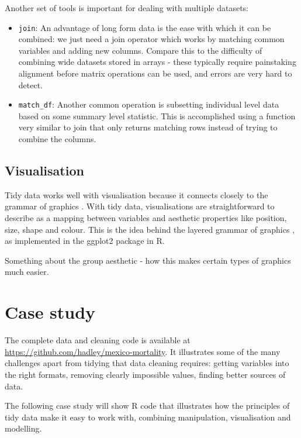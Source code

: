 \documentclass[oneside]{article}
\begin{document}
Another set of tools is important for dealing with multiple datasets: 

\begin{itemize}

\item {\tt join}: An advantage of long form data is the ease with which it can be combined: we just need a join operator which works by matching common variables and adding new columns. Compare this to the difficulty of combining wide datasets stored in arrays - these typically require painstaking alignment before matrix operations can be used, and errors are very hard to detect. 

\item {\tt match\_df}: Another common operation is subsetting individual level data based on some summary level statistic. This is accomplished using a function very similar to join that only returns matching rows instead of trying to combine the columns.

\end{itemize}

\subsection{Visualisation}

Tidy data works well with visualisation because it connects closely to the grammar of graphics \citep{wilkinson:2006}. With tidy data, visualisations are straightforward to describe as a mapping between variables and aesthetic properties like position, size, shape and colour. This is the idea behind the layered grammar of graphics \citep{wickham:2007d}, as implemented in the ggplot2 package in R.

Something about the group aesthetic - how this makes certain types of graphics much easier.

\section{Case study} 

The complete data and cleaning code is available at \url{https://github.com/hadley/mexico-mortality}.  It illustrates some of the many challenges apart from tidying that data cleaning requires: getting variables into the right formats, removing clearly impossible values, finding better sources of data. 

The following case study will show R code that illustrates how the principles of tidy data make it easy to work with, combining manipulation, visualisation and modelling.
\end{document}
